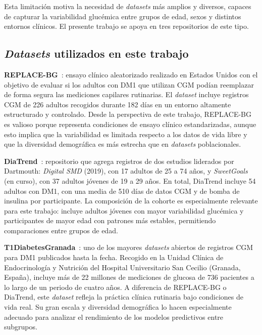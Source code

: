 Esta limitación motiva la necesidad de \emph{datasets} más amplios y diversos, capaces de capturar la variabilidad glucémica entre grupos de edad, sexos y distintos entornos clínicos. El presente trabajo se apoya en tres repositorios de este tipo.

\subsection{\emph{Datasets} utilizados en este trabajo}
\label{subsec:datasets_utilizados}

\textbf{REPLACE-BG}~\cite{aleppo2017replace}: ensayo clínico aleatorizado realizado en Estados Unidos con el objetivo de evaluar si los adultos con DM1 que utilizan CGM podían reemplazar de forma segura las mediciones capilares rutinarias. El \emph{dataset} incluye registros CGM de 226 adultos recogidos durante 182 días en un entorno altamente estructurado y controlado. Desde la perspectiva de este trabajo, REPLACE-BG es valioso porque representa condiciones de ensayo clínico estandarizadas, aunque esto implica que la variabilidad es limitada respecto a los datos de vida libre y que la diversidad demográfica es más estrecha que en \emph{datasets} poblacionales.

\textbf{DiaTrend}~\cite{sun2023diatrend}: repositorio que agrega registros de dos estudios liderados por Dartmouth: \emph{Digital SMD} (2019), con 17 adultos de 25 a 74 años, y \emph{SweetGoals} (en curso), con 37 adultos jóvenes de 19 a 29 años. En total, DiaTrend incluye 54 adultos con DM1, con una media de 510 días de datos CGM y de bomba de insulina por participante. La composición de la cohorte es especialmente relevante para este trabajo: incluye adultos jóvenes con mayor variabilidad glucémica y participantes de mayor edad con patrones más estables, permitiendo comparaciones entre grupos de edad.

\textbf{T1DiabetesGranada}~\cite{diaz2023t1dgranada}: uno de los mayores \emph{datasets} abiertos de registros CGM para DM1 publicados hasta la fecha. Recogido en la Unidad Clínica de Endocrinología y Nutrición del Hospital Universitario San Cecilio (Granada, España), incluye más de 22 millones de mediciones de glucosa de 736 pacientes a lo largo de un periodo de cuatro años. A diferencia de REPLACE-BG o DiaTrend, este \emph{dataset} refleja la práctica clínica rutinaria bajo condiciones de vida real. Su gran escala y diversidad demográfica lo hacen especialmente adecuado para analizar el rendimiento de los modelos predictivos entre subgrupos.

